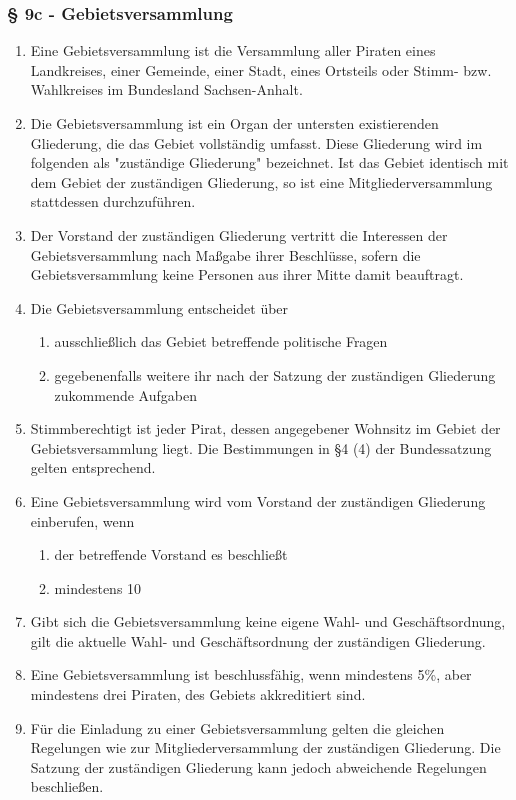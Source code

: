 \documentclass[draft,a4paper,10pt]{article}
\begin{document}
\subsubsection{§ 9c - Gebietsversammlung}
\begin{enumerate}
\item Eine Gebietsversammlung ist die Versammlung aller Piraten eines Landkreises, einer Gemeinde, einer Stadt, eines Ortsteils oder Stimm- bzw. Wahlkreises im Bundesland Sachsen-Anhalt.

\item Die Gebietsversammlung ist ein Organ der untersten existierenden
Gliederung, die das Gebiet vollständig umfasst. Diese Gliederung wird im
folgenden als "zuständige Gliederung" bezeichnet. Ist das Gebiet identisch mit
dem Gebiet der zuständigen Gliederung, so ist eine Mitgliederversammlung
stattdessen durchzuführen.

\item Der Vorstand der zuständigen Gliederung vertritt die Interessen der
Gebietsversammlung nach Maßgabe ihrer Beschlüsse, sofern die Gebietsversammlung
keine Personen aus ihrer Mitte damit beauftragt.

\item Die Gebietsversammlung entscheidet über
\begin{enumerate}
\item ausschließlich das Gebiet betreffende politische Fragen

\item gegebenenfalls weitere ihr nach der Satzung der zuständigen Gliederung
zukommende Aufgaben
\end{enumerate}

\item Stimmberechtigt ist jeder Pirat, dessen angegebener Wohnsitz im Gebiet der
Gebietsversammlung liegt. Die Bestimmungen in §4 (4) der Bundessatzung gelten
entsprechend.

\item Eine Gebietsversammlung wird vom Vorstand der zuständigen Gliederung
einberufen, wenn
\begin{enumerate}
\item der betreffende Vorstand es beschließt

\item mindestens 10%
\end{enumerate}

\item Gibt sich die Gebietsversammlung keine eigene Wahl- und Geschäftsordnung,
gilt die aktuelle Wahl- und Geschäftsordnung der zuständigen Gliederung.

\item Eine Gebietsversammlung ist beschlussfähig, wenn mindestens 5\%, aber
mindestens drei Piraten, des Gebiets akkreditiert sind.

\item Für die Einladung zu einer Gebietsversammlung gelten die gleichen
Regelungen wie zur Mitgliederversammlung der zuständigen Gliederung. Die Satzung
der zuständigen Gliederung kann jedoch abweichende Regelungen beschließen.
\end{enumerate}
\end{document}
